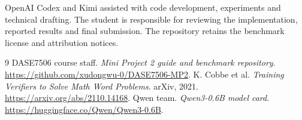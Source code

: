 \documentclass[10pt]{article}
\begin{document}
OpenAI Codex and Kimi assisted with code development, experiments and technical drafting. The student is responsible for reviewing the implementation, reported results and final submission. The repository retains the benchmark license and attribution notices.
\begin{thebibliography}{9}
 DASE7506 course staff. \emph{Mini Project 2 guide and benchmark repository}. \url{https://github.com/xudongwu-0/DASE7506-MP2}.
 K. Cobbe et al. \emph{Training Verifiers to Solve Math Word Problems}. arXiv, 2021. \url{https://arxiv.org/abs/2110.14168}.
 Qwen team. \emph{Qwen3-0.6B model card}. \url{https://huggingface.co/Qwen/Qwen3-0.6B}.
\end{thebibliography}
\end{document}
